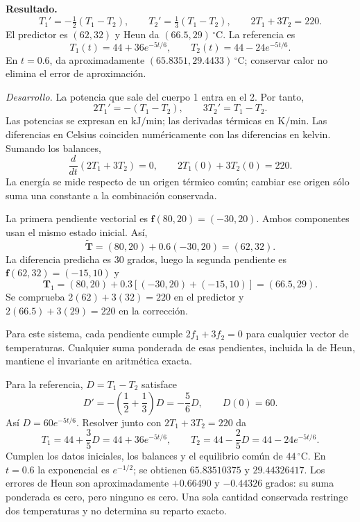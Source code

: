 \noindent\textbf{Resultado.} \[
T_1'=-\tfrac12(T_1-T_2),\qquad T_2'=\tfrac13(T_1-T_2),\qquad 2T_1+3T_2=220.
\]
El predictor es \((62,32)\) y Heun da \((66.5,29)\,{}^\circ\mathrm C\). La referencia es
\[
T_1(t)=44+36e^{-5t/6},\qquad T_2(t)=44-24e^{-5t/6}.
\]
En \(t=0.6\), da aproximadamente \((65.8351,29.4433)\,{}^\circ\mathrm C\); conservar calor no elimina el error de aproximación.

\noindent\textit{Desarrollo.} La potencia que sale del cuerpo 1 entra en el 2. Por tanto,
\[
2T_1'=-(T_1-T_2),\qquad3T_2'=T_1-T_2.
\]
Las potencias se expresan en \(\mathrm{kJ/min}\); las derivadas térmicas en \(\mathrm{K/min}\). Las diferencias en Celsius coinciden numéricamente con las diferencias en kelvin. Sumando los balances,
\[
\frac{d}{dt}(2T_1+3T_2)=0,\qquad2T_1(0)+3T_2(0)=220.
\]
La energía se mide respecto de un origen térmico común; cambiar ese origen sólo suma una constante a la combinación conservada.

La primera pendiente vectorial es \(\mathbf f(80,20)=(-30,20)\). Ambos componentes usan el mismo estado inicial. Así,
\[
\widetilde{\mathbf T}=(80,20)+0.6(-30,20)=(62,32).
\]
La diferencia predicha es 30 grados, luego la segunda pendiente es \(\mathbf f(62,32)=(-15,10)\) y
\[
\mathbf T_1=(80,20)+0.3[(-30,20)+(-15,10)]=(66.5,29).
\]
Se comprueba \(2(62)+3(32)=220\) en el predictor y \(2(66.5)+3(29)=220\) en la corrección.

Para este sistema, cada pendiente cumple \(2f_1+3f_2=0\) para cualquier vector de temperaturas. Cualquier suma ponderada de esas pendientes, incluida la de Heun, mantiene el invariante en aritmética exacta.

Para la referencia, \(D=T_1-T_2\) satisface
\[
D'=-\left(\frac12+\frac13\right)D=-\frac56D,\qquad D(0)=60.
\]
Así \(D=60e^{-5t/6}\). Resolver junto con \(2T_1+3T_2=220\) da
\[
T_1=44+\frac35D=44+36e^{-5t/6},\qquad
T_2=44-\frac25D=44-24e^{-5t/6}.
\]
Cumplen los datos iniciales, los balances y el equilibrio común de \(44\,{}^\circ\mathrm C\). En \(t=0.6\) la exponencial es \(e^{-1/2}\); se obtienen \(65.83510375\) y \(29.44326417\). Los errores de Heun son aproximadamente \(+0.66490\) y \(-0.44326\) grados: su suma ponderada es cero, pero ninguno es cero. Una sola cantidad conservada restringe dos temperaturas y no determina su reparto exacto.
